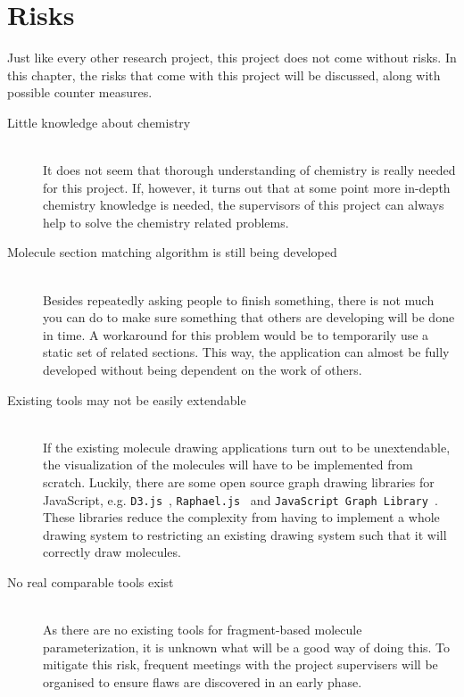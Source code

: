 \chapter{Risks}

Just like every other research project, this project does not come without risks. In this chapter, the risks that come with this project will be discussed, along with possible counter measures.

\begin{description}
\item[Little knowledge about chemistry]~~\\
It does not seem that thorough understanding of chemistry is really needed for this project. If, however, it turns out that at some point more in-depth chemistry knowledge is needed, the supervisors of this project can always help to solve the chemistry related problems.

\item[Molecule section matching algorithm is still being developed]~~\\
Besides repeatedly asking people to finish something, there is not much you can do to make sure something that others are developing will be done in time. A workaround for this problem would be to temporarily use a static set of related sections. This way, the application can almost be fully developed without being dependent on the work of others.

\item[Existing tools may not be easily extendable]~~\\
If the existing molecule drawing applications turn out to be unextendable, the visualization of the molecules will have to be implemented from scratch. Luckily, there are some open source graph drawing libraries for JavaScript, e.g. \verb|D3.js|~\cite{bostock2012data}, \verb|Raphael.js|~\cite{baranovski2013raphael} and \verb|JavaScript Graph Library|~\cite{dracula2012javascript}. These libraries reduce the complexity from having to implement a whole drawing system to restricting an existing drawing system such that it will correctly draw molecules. 

\item[No real comparable tools exist]~~\\
As there are no existing tools for fragment-based molecule parameterization, it is unknown what will be a good way of doing this. To mitigate this risk, frequent meetings with the project supervisers will be organised to ensure flaws are discovered in an early phase.
\end{description}
